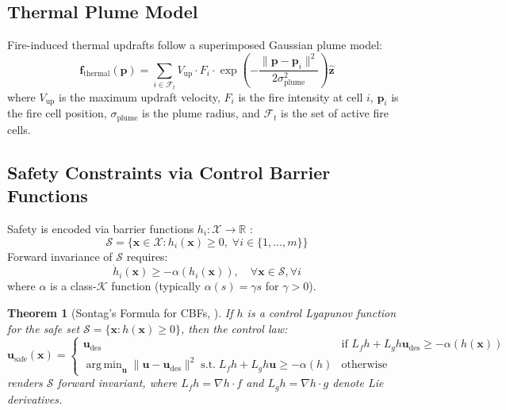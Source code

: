 \documentclass[12pt,a4paper]{article}
\DeclareRobustCommand{\cF}{\mathcal{F}}
\DeclareRobustCommand{\cK}{\mathcal{K}}
\DeclareRobustCommand{\cS}{\mathcal{S}}
\DeclareRobustCommand{\cX}{\mathcal{X}}
\DeclareRobustCommand{\R}{\mathbb{R}}
\DeclareRobustCommand{\vect}[1]{\bm{#1}}
\DeclareMathOperator*{\argmin}{arg\,min}
\newtheorem{theorem}{Theorem}[section]
\begin{document}
\subsection{Thermal Plume Model}

Fire-induced thermal updrafts follow a superimposed Gaussian plume model:
\begin{equation}
    \vect{f}_{\text{thermal}}(\vect{p}) = \sum_{i \in \cF_t} V_{\text{up}} \cdot F_i \cdot \exp\left(-\frac{\|\vect{p} - \vect{p}_i\|^2}{2\sigma_{\text{plume}}^2}\right) \hat{\vect{z}}
    \label{eq:thermal}
\end{equation}
where $V_{\text{up}}$ is the maximum updraft velocity, $F_i$ is the fire intensity at cell $i$, $\vect{p}_i$ is the fire cell position, $\sigma_{\text{plume}}$ is the plume radius, and $\cF_t$ is the set of active fire cells.

\subsection{Safety Constraints via Control Barrier Functions}

Safety is encoded via barrier functions $h_i : \cX \to \R$ \cite{Ames2014}:
\begin{equation}
    \cS = \{\vect{x} \in \cX : h_i(\vect{x}) \geq 0, \;\forall i \in \{1, \ldots, m\}\}
    \label{eq:safe_set}
\end{equation}
Forward invariance of $\cS$ requires:
\begin{equation}
    \dot{h}_i(\vect{x}) \geq -\alpha(h_i(\vect{x})), \quad \forall \vect{x} \in \cS, \forall i
    \label{eq:cbf_condition}
\end{equation}
where $\alpha$ is a class-$\cK$ function (typically $\alpha(s) = \gamma s$ for $\gamma > 0$).

\begin{theorem}[Sontag's Formula for CBFs, {\cite{Ames2014}}]
\label{thm:sontag}
If $h$ is a control Lyapunov function for the safe set $\cS = \{\vect{x} : h(\vect{x}) \geq 0\}$, then the control law:
\begin{equation}
    \vect{u}_{\text{safe}}(\vect{x}) = \begin{cases}
    \vect{u}_{\text{des}} & \text{if } L_f h + L_g h \vect{u}_{\text{des}} \geq -\alpha(h(\vect{x})) \\
    \argmin_{\vect{u}} \|\vect{u} - \vect{u}_{\text{des}}\|^2 \;\text{s.t.}\; L_f h + L_g h \vect{u} \geq -\alpha(h) & \text{otherwise}
    \end{cases}
\end{equation}
renders $\cS$ forward invariant, where $L_f h = \nabla h \cdot f$ and $L_g h = \nabla h \cdot g$ denote Lie derivatives.
\end{theorem}
\end{document}

